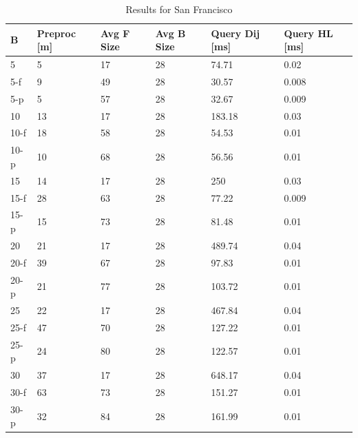 \begin{table}\caption{Results for San Francisco}\label{tab:sf_results}
\begin{center}
\begin{tabular}{ | l | p{1cm} | p{1cm} | p{1cm} | p{1.2cm} | p{1.2cm} | }
\hline
	B & Preproc [m] & Avg F Size & Avg B Size & Query Dij [ms] & Query HL [ms] \\ \hline \hline
5  & 5  & 17 & 28 & 74.71  & 0.02  \\
5-f  & 9  & 49 & 28 & 30.57  & 0.008 \\
5-p  & 5  & 57 & 28 & 32.67  & 0.009 \\\hline
10 & 13 & 17 & 28 & 183.18 & 0.03  \\
10-f & 18 & 58 & 28 & 54.53  & 0.01  \\
10-p & 10 & 68 & 28 & 56.56  & 0.01  \\\hline
15 & 14 & 17 & 28 & 250    & 0.03  \\
15-f & 28 & 63 & 28 & 77.22  & 0.009 \\
15-p & 15 & 73 & 28 & 81.48  & 0.01  \\\hline
20 & 21 & 17 & 28 & 489.74 & 0.04  \\
20-f & 39 & 67 & 28 & 97.83  & 0.01  \\
20-p & 21 & 77 & 28 & 103.72 & 0.01  \\\hline
25 & 22 & 17 & 28 & 467.84 & 0.04  \\
25-f & 47 & 70 & 28 & 127.22 & 0.01  \\
25-p & 24 & 80 & 28 & 122.57 & 0.01  \\\hline
30 & 37 & 17 & 28 & 648.17 & 0.04  \\
30-f & 63 & 73 & 28 & 151.27 & 0.01  \\
30-p & 32 & 84 & 28 & 161.99 & 0.01  \\\hline
\end{tabular}
\end{center}
\end{table}
 
